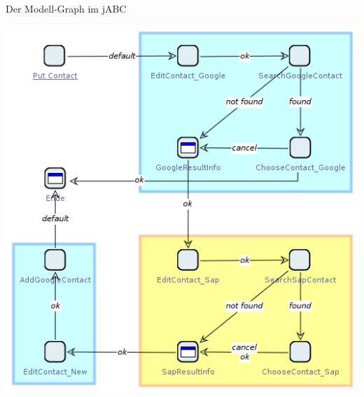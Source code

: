 \subsection*{}
\begin{frame}{Der Modell-Graph im jABC}
\begin{center}
\includegraphics[height=0.8\textheight]{Bilder/jabc_Model.png} 
\end{center}
\end{frame}



